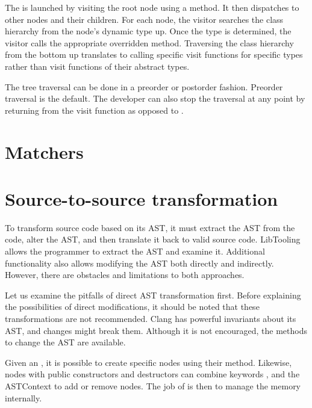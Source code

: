 
The  is launched by visiting the root node using 
a  method. 
It then dispatches to other nodes and their children. 
For each node, the visitor searches the class hierarchy from 
the node's dynamic type up. 
Once the type is determined, the visitor calls the appropriate 
overridden  method. 
Traversing the class hierarchy from the bottom up 
translates to calling specific visit functions for specific types 
rather than visit functions of their abstract types.

The tree traversal can be done in a preorder or postorder fashion. 
Preorder traversal is the default. The developer can also stop
the traversal at any point by returning  from
the visit function as opposed to .

\section{Matchers}


\section{Source-to-source transformation}

To transform source code based on its AST, it must extract the AST 
from the code, alter the AST, and then translate it back to valid 
source code. 
LibTooling allows the programmer to extract the AST and examine it. 
Additional functionality also allows modifying the AST both directly 
and indirectly. 
However, there are obstacles and limitations to both approaches. 

Let us examine the pitfalls of direct AST transformation first. 
Before explaining the possibilities of direct modifications, it 
should be noted that these transformations are not recommended. 
Clang has powerful invariants about its AST, and changes might 
break them. 
Although it is not encouraged, the methods to change the AST 
are available.

Given an , it is possible to create specific nodes
using their  method. 
Likewise, nodes with public constructors and destructors can combine 
keywords ,  and the ASTContext 
to add or remove nodes. 
The job of  is then to manage the memory internally.

